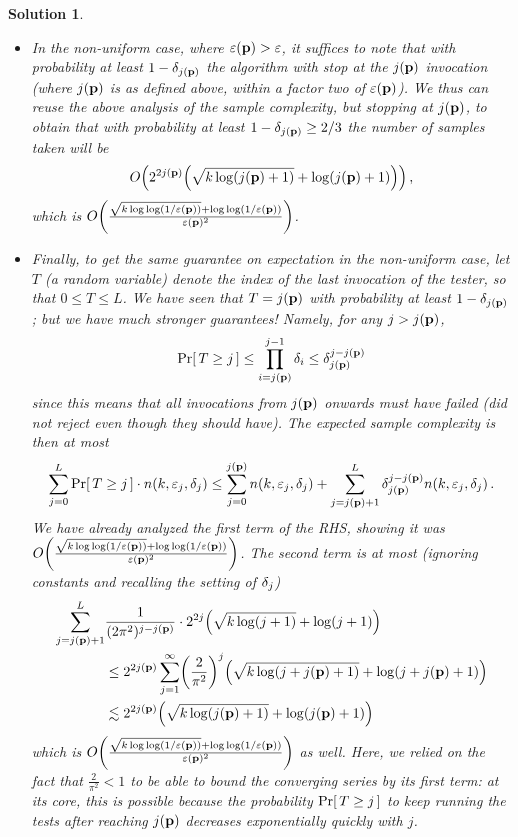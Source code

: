 \documentclass[biber]{nowfnt} %
\newtheorem{solution}{Solution}[chapter]
\begin{document}
\begin{solution}
\begin{itemize}
\[
	\bigO{\frac{\sqrt{\ab\log\log(1/\dst)} + \log\log(1/\dst)}{\dst^2}}
\]
as claimed.
\item In the non-uniform case, where $\varepsilon(\mathbf{p}) > \varepsilon$, it suffices to note that with probability at least $1-\delta_{j(\mathbf{p})}$ the algorithm with stop at the $j(\mathbf{p})$ invocation (where $j(\mathbf{p})$ is as defined above, within a factor two of $\varepsilon(\mathbf{p})$). We thus can reuse the above analysis of the sample complexity, but stopping at $j(\mathbf{p})$, to obtain that with probability at least $1-\delta_{j(\mathbf{p})} \geq 2/3$ the number of samples taken will be
\[
	\bigO{2^{2j(\p)}\Paren{\sqrt{\ab\log(j(\p)+1)} + \log(j(\p)+1)}}\,,
\]
which is $\bigO{\frac{\sqrt{\ab\log\log(1/\dst(\p))} + \log\log(1/\dst(\p))}{\dst(\p)^2}}$.
\item Finally, to get the same guarantee \emph{on expectation} in the non-uniform case, let $T$ (a random variable) denote the index of the last invocation of the tester, so that $0\leq T \leq L$. We have seen that $T=j(\mathbf{p})$ with probability at least $1-\delta_{j(\mathbf{p})}$; but we have much stronger guarantees! Namely, for any $j > j(\mathbf{p})$,
\[
	\probaOf{T \geq j} \leq \prod_{i=j(\p)}^{j-1}\errprob_{i} \leq \errprob_{j(\p)}^{j-j(\p)}
\]
since this means that all invocations from $j(\mathbf{p})$ onwards must have failed (\ie did not reject even though they should have). The expected sample complexity is then at most
\[
	\sum_{j=0}^L \probaOf{T \geq j}\cdot  \ns(\ab,\dst_j, \errprob_j)
	\leq \sum_{j=0}^{j(\p)} \ns(\ab,\dst_j, \errprob_j)
	+ \sum_{j=j(\p)+1}^L \errprob_{j(\p)}^{j-j(\p)} \ns(\ab,\dst_j, \errprob_j)\,.
\]
We have already analyzed the first term of the RHS, showing it was $\bigO{\frac{\sqrt{\ab\log\log(1/\dst(\p))} + \log\log(1/\dst(\p))}{\dst(\p)^2}}$. The second term is at most (ignoring constants and recalling the setting of $\delta_j$)
\begin{align*}
	\sum_{j=j(\p)+1}^L &\frac{1}{(2\pi^2)^{j-j(\p)}} \cdot 2^{2j}\Paren{\sqrt{\ab\log(j+1)} + \log(j+1)} \\
	&\leq 2^{2j(\p)}\sum_{j=1}^\infty \Paren{\frac{2}{\pi^2}}^{j}\Paren{\sqrt{\ab\log(j+j(\p)+1)} + \log(j+j(\p)+1)} \\
	&\lesssim 2^{2j(\p)}\Paren{\sqrt{\ab\log(j(\p)+1)} + \log(j(\p)+1)}
\end{align*}
which is $\bigO{\frac{\sqrt{\ab\log\log(1/\dst(\p))} + \log\log(1/\dst(\p))}{\dst(\p)^2}}$ as well. Here, we relied on the fact that $\frac{2}{\pi^2} < 1$ to be able to bound the converging series by its first term: at its core, this is possible because the probability $\probaOf{T \geq j}$ to keep running the tests after reaching $j(\mathbf{p})$ decreases exponentially quickly with $j$.
\end{itemize}
\end{solution}
\end{document}
